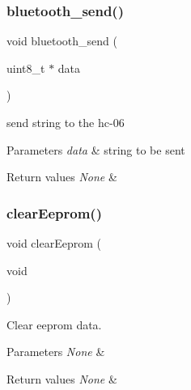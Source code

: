 \subsubsection{\texorpdfstring{bluetooth\+\_\+send()}{bluetooth\_send()}}
{\footnotesize\ttfamily void bluetooth\+\_\+send (\begin{DoxyParamCaption}\item[{uint8\+\_\+t $\ast$}]{data }\end{DoxyParamCaption})}



send string to the hc-\/06 


\begin{DoxyParams}{Parameters}
{\em data} & string to be sent \\
\hline
\end{DoxyParams}

\begin{DoxyRetVals}{Return values}
{\em None} & \\
\hline
\end{DoxyRetVals}
\mbox{\label{group___transmission_ga22e1179dc9f78a6771b2ae3f2e246595}} 
\subsubsection{\texorpdfstring{clear\+Eeprom()}{clearEeprom()}}
{\footnotesize\ttfamily void clear\+Eeprom (\begin{DoxyParamCaption}\item[{void}]{ }\end{DoxyParamCaption})}



Clear eeprom data. 


\begin{DoxyParams}{Parameters}
{\em None} & \\
\hline
\end{DoxyParams}

\begin{DoxyRetVals}{Return values}
{\em None} & \\
\hline
\end{DoxyRetVals}
\mbox{\label{group___transmission_gafaa7cca6f6ad1d9ae49522324c825c2f}} 
